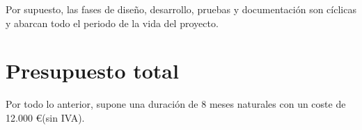 Por supuesto, las fases de diseño, desarrollo, pruebas y documentación
son cíclicas y abarcan todo el periodo de la vida del proyecto.


\section{Presupuesto total}

Por todo lo anterior, supone una duración de 8 meses naturales con un coste de 12.000 \euro (sin IVA).
